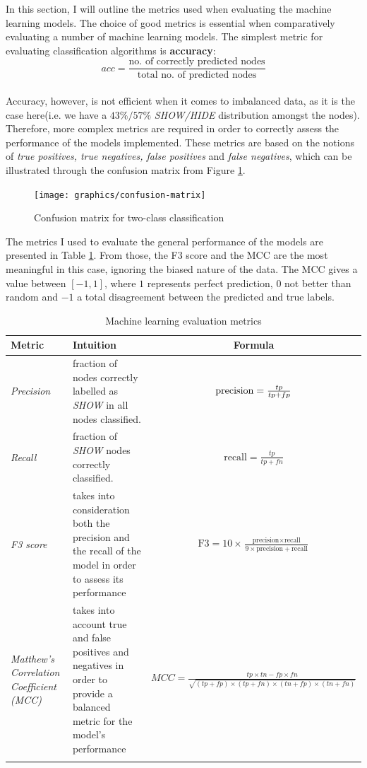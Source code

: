 		In this section, I will outline the metrics used when evaluating the machine learning models. The choice of good metrics is essential when comparatively evaluating a number of machine learning models. The simplest metric for evaluating classification algorithms is \textbf{accuracy}: 
		\\
		\begin{equation}
			acc = \frac{\text{no. of correctly predicted nodes}}{\text{total no. of predicted nodes}}
		\end{equation}
		\\
		Accuracy, however, is not efficient when it comes to imbalanced data, as it is the case here(i.e. we have a $43\%/57\%$ \textit{SHOW/HIDE} distribution amongst the nodes). Therefore, more complex metrics are required in order to correctly assess the performance of the models implemented. These metrics are based on the notions of \textit{true positives, true negatives, false positives} and \textit{false negatives}, which can be illustrated through the confusion matrix from Figure \ref{Fig: eval/ml/metrics/confusion-matrix}.
		\begin{figure}[H]
			\centering
			\texttt{[image: graphics/confusion-matrix]}
			\caption{Confusion matrix for two-class classification}
			\label{Fig: eval/ml/metrics/confusion-matrix}
		\end{figure}
		The metrics I used to evaluate the general performance of the models are presented in Table \ref{Table: eval/ml/metrics/metrics}. From those, the F3 score and the MCC are the most meaningful in this case, ignoring the biased nature of the data. The MCC gives a value between $[-1, 1]$, where $1$ represents perfect prediction, $0$ not better than random and $-1$ a total disagreement between the predicted and true labels.
		\begin{longtable}{|p{}|p{}|c|}
		   \textbf{Metric} & \textbf{Intuition} &\textbf{Formula} \\
			\hline
			\textit{Precision} & fraction of nodes correctly labelled as \textit{SHOW} in all nodes classified. & {$\centering \text{precision} = \frac{tp}{tp+fp}$} \\
			\hline 
			\textit{Recall} & fraction of \textit{SHOW} nodes correctly classified. & $\text{recall} = \frac{tp}{tp+fn}$ \\
			\hline
			\textit{F3 score} & takes into consideration both the precision and the recall of the model in order to assess its performance & $\text{F3} = 10\times\frac{\text{precision}\times\text{recall}}{9\times\text{precision} + \text{recall}}$\\
			\hline 
			\textit{Matthew's Correlation Coefficient (MCC)} & takes into account true and false positives and negatives in order to provide a balanced metric for the model's performance & $MCC = \frac{tp\times tn - fp\times fn}{\sqrt{(tp+fp)\times(tp+fn)\times(tn+fp)\times(tn+fn)}}$\\
			\hline
			\caption{Machine learning evaluation metrics}
			\label{Table: eval/ml/metrics/metrics}
		\end{longtable}
		
